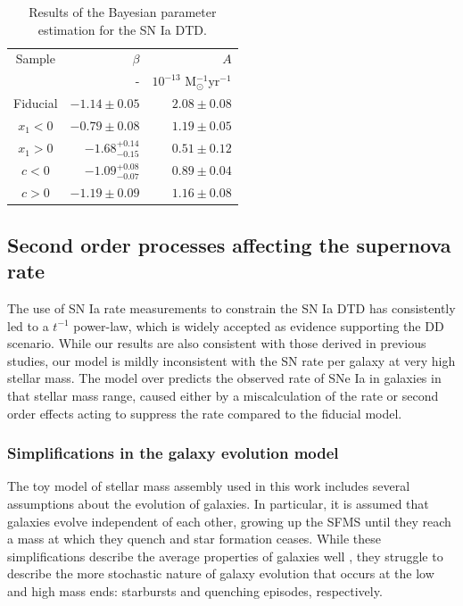 \documentclass[fleqn,usenatbib]{mnras}
\begin{document}
\renewcommand{\arraystretch}{1.2}
\begin{table}
	\centering
	\caption{Results of the Bayesian parameter estimation for the SN Ia DTD.}
	\label{tab:dtd_results_split_lc}
	\begin{tabular}{crr} %
		\hline
		 Sample &$\beta$ & $A$ \\
		 &-       & $10^{-13}$ M$_{\odot}^{-1}$yr$^{-1}$ \\
		\hline
		Fiducial & $-1.14\pm0.05$ &  $2.08\pm0.08$ \\
	    $x_1 < 0$ & $-0.79\pm0.08$ &  $1.19 \pm0.05$ \\
		$x_1 > 0$ & $-1.68 _{ -0.15} ^{ +0.14}$ & $0.51\pm0.12$ \\
		$c < 0$ & $-1.09 _{ -0.07} ^{ +0.08}$ & $0.89\pm0.04$ \\
		$c > 0$ & $-1.19\pm0.09$ & $1.16\pm0.08$ \\
		\hline
	\end{tabular}
\end{table}
\subsection{Second order processes affecting the supernova rate \label{subsec:discussion}}

The use of SN Ia rate measurements to constrain the SN Ia DTD has consistently led to a $t^{-1}$ power-law, which is widely accepted as evidence supporting the DD scenario. While our results are also consistent with those derived in previous studies, our model is mildly inconsistent with the SN rate per galaxy at very high stellar mass. The model over predicts the observed rate of SNe Ia in galaxies in that stellar mass range, caused either by a miscalculation of the rate or second order effects acting to suppress the rate compared to the fiducial model.

\subsubsection{Simplifications in the galaxy evolution model}

The toy model of stellar mass assembly used in this work includes several assumptions about the evolution of galaxies. In particular, it is assumed that galaxies evolve independent of each other, growing up the SFMS until they reach a mass at which they quench and star formation ceases. While these simplifications describe the average properties of galaxies well \citep{Zahid2012, Childress2014}, they struggle to describe the more stochastic nature of galaxy evolution that occurs at the low and high mass ends: starbursts and quenching episodes, respectively. 
\end{document}
